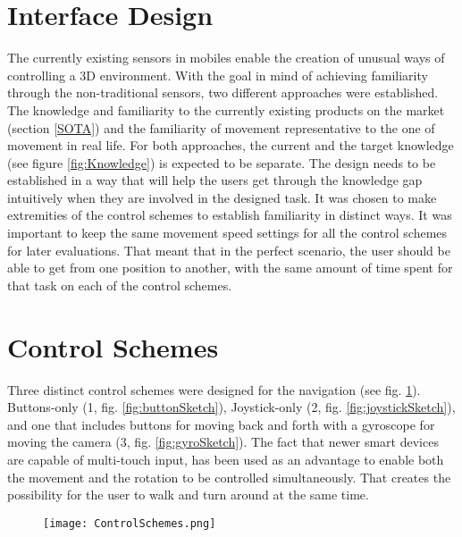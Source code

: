 \section{Interface Design}
The currently existing sensors in mobiles enable the creation of unusual ways of controlling a 3D environment. With the goal in mind of achieving familiarity through the non-traditional sensors, two different approaches were established. The knowledge and familiarity to the currently existing products on the market (section \ref{SOTA}) and the familiarity of movement representative to the one of movement in real life. For both approaches, the current and the target knowledge (see figure \ref{fig:Knowledge}) is expected to be separate. The design needs to be established in a way that will help the users get through the knowledge gap intuitively when they are involved in the designed task. It was chosen to make extremities of the control schemes to establish familiarity in distinct ways. It was important to keep the same movement speed settings for all the control schemes for later evaluations. That meant that in the perfect scenario, the user should be able to get from one position to another, with the same amount of time spent for that task on each of the control schemes.

\section{Control Schemes}
Three distinct control schemes were designed for the navigation (see fig. \ref{fig:ControlSchemes}). Buttons-only (1, fig. \ref{fig:buttonSketch}), Joystick-only (2, fig. \ref{fig:joystickSketch}), and one that includes buttons for moving back and forth with a gyroscope for moving the camera (3, fig. \ref{fig:gyroSketch}). The fact that newer smart devices are capable of multi-touch input, has been used as an advantage to enable both the movement and the rotation to be controlled simultaneously. That creates the possibility for the user to walk and turn around at the same time.

\begin{figure}[H]
\centering
  \texttt{[image: ControlSchemes.png]}
  \label{fig:ControlSchemes}
\end{figure}

